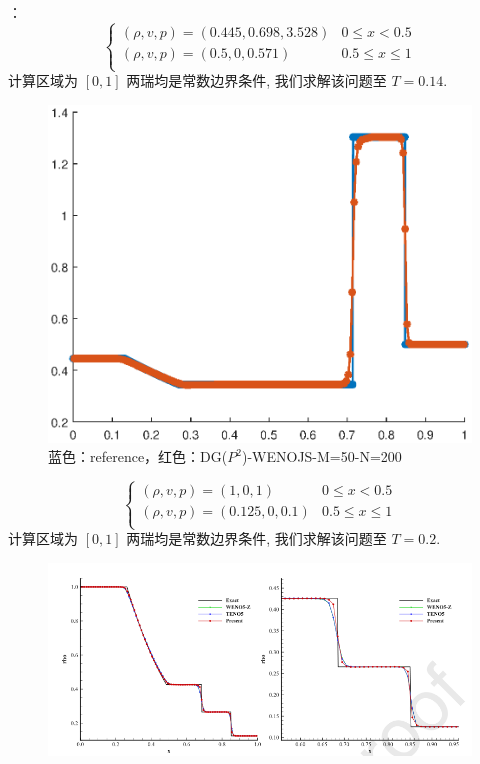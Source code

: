 \documentclass{book}
\begin{document}
\begin{example}
    \cite{RN204}：
    \begin{equation}
        \begin{cases}
            (\rho, v, p)  =(0.445,0.698,3.528) & 0\leqslant x < 0.5         \\
            (\rho, v, p) =(0.5,0,0.571)        & 0.5\leqslant x \leqslant 1 \\
        \end{cases}
    \end{equation}
    计算区域为 $[0,1]$ 两瑞均是常数边界条件, 我们求解该问题至 $T=0.14$.
    \begin{figure}[H]
        \centering
        \label{fig:}
        \includegraphics[width=0.7\linewidth]{fig/lax.eps}
        \caption{蓝色：reference，红色：DG($P^2$)-WENOJS-M=50-N=200}
    \end{figure}

\end{example}
\begin{example}
    \begin{equation}
        \begin{cases}
            (\rho, v, p)  =(1,0,1)      & 0\leqslant x < 0.5         \\
            (\rho, v, p) =(0.125,0,0.1) & 0.5\leqslant x \leqslant 1 \\
        \end{cases}
    \end{equation}
    计算区域为 $[0,1]$ 两瑞均是常数边界条件, 我们求解该问题至 $T=0.2$.
    \begin{figure}[htp]
        \centering
        \label{fig:}
        \includegraphics[width=0.7\linewidth]{fig/sod_problem.png}
        \caption{}
    \end{figure}

\end{example}
\end{document}
